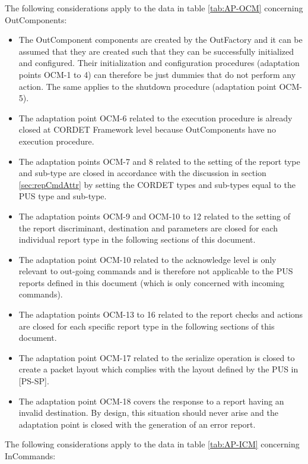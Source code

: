 \documentclass{pnp_article}
\begin{document}
The following considerations apply to the data in table \ref{tab:AP-OCM} concerning OutComponents:

\begin{itemize}
\item The OutComponent components are created by the OutFactory and it can be assumed that they are created such that they can be successfully initialized and configured. Their initialization and configuration procedures (adaptation points OCM-1 to 4) can therefore be just dummies that do not perform any action. The same applies to the shutdown procedure (adaptation point OCM-5).
\item The adaptation point OCM-6 related to the execution procedure is already closed at CORDET Framework level because OutComponents have no execution procedure.
\item The adaptation points OCM-7 and 8 related to the setting of the report type and sub-type are closed in accordance with the discussion in section \ref{sec:repCmdAttr} by setting the CORDET types and sub-types equal to the PUS type and sub-type.
\item The adaptation points OCM-9 and OCM-10 to 12 related to the setting of the report discriminant, destination and parameters are closed for each individual report type in the following sections of this document.
\item The adaptation point OCM-10 related to the acknowledge level is only relevant to out-going commands and is therefore not applicable to the PUS reports defined in this document (which is only concerned with incoming commands).
\item The adaptation points OCM-13 to 16 related to the report checks and actions are closed for each specific report type in the following sections of this document.
\item The adaptation point OCM-17 related to the serialize operation is closed to create a packet layout which complies with the layout defined by the PUS in [PS-SP].
\item The adaptation point OCM-18 covers the response to a report having an invalid destination. By design, this situation should never arise and the adaptation point is closed with the generation of an error report.
\end{itemize}

The following considerations apply to the data in table \ref{tab:AP-ICM} concerning InCommands:
\end{document}
